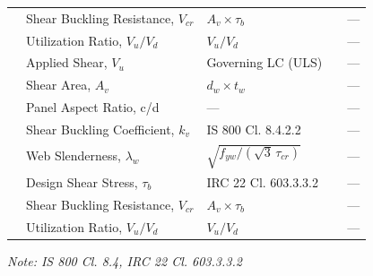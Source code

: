 \documentclass[12pt,a4paper]{report}
\numberwithin{table}{chapter}
\numberwithin{figure}{chapter}
\begin{document}
\begin{longtable}{|C{2.5cm}|C{3.5cm}|C{3.5cm}|>{\centering\arraybackslash}p{4.2cm}|C{1.8cm}|}
 & Shear Buckling Resistance, $V_{cr}$ & $A_v \times \tau_b$ &  & --- \\[6pt]
 & Utilization Ratio, $V_u / V_d$ & $V_u / V_d$ &  & --- \\[6pt]
\hline
{} & Applied Shear, $V_u$ & Governing LC (ULS) &  & --- \\[6pt]
 & Shear Area, $A_v$ & $d_w \times t_w$ &  & --- \\[6pt]
 & Panel Aspect Ratio, c/d & --- &  & --- \\[6pt]
 & Shear Buckling Coefficient, $k_v$ & IS 800 Cl. 8.4.2.2 &  & --- \\[6pt]
 & Web Slenderness, $\lambda_w$ & $\sqrt{f_{yw}/(\sqrt{3}\,\tau_{cr})}$ &  & --- \\[6pt]
 & Design Shear Stress, $\tau_b$ & IRC 22 Cl. 603.3.3.2 &  & --- \\[6pt]
 & Shear Buckling Resistance, $V_{cr}$ & $A_v \times \tau_b$ &  & --- \\[6pt]
 & Utilization Ratio, $V_u / V_d$ & $V_u / V_d$ &  & --- \\[6pt]
\hline
\end{longtable}
\noindent\textit{Note: IS 800 Cl. 8.4, IRC 22 Cl. 603.3.3.2}
\end{document}
